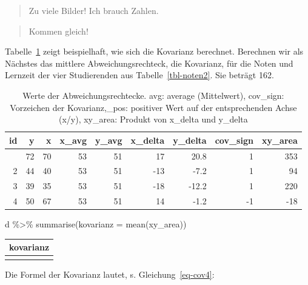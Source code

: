 \documentclass[
  letterpaper,
]{scrbook}
\newenvironment{Shaded}{\begin{snugshade}}{\end{snugshade}}
\newcommand{\AttributeTok}[1]{\textcolor[rgb]{0.40,0.45,0.13}{#1}}
\newcommand{\FunctionTok}[1]{\textcolor[rgb]{0.28,0.35,0.67}{#1}}
\newcommand{\NormalTok}[1]{\textcolor[rgb]{0.00,0.23,0.31}{#1}}
\newcommand{\SpecialCharTok}[1]{\textcolor[rgb]{0.37,0.37,0.37}{#1}}
\theoremstyle{definition}
\theoremstyle{definition}
\theoremstyle{definition}
\theoremstyle{remark}
\begin{document}
\begin{quote}
{} Zu viele Bilder! Ich brauch Zahlen.
\end{quote}

\begin{quote}
{} Kommen gleich!
\end{quote}

Tabelle~\ref{tbl-kov2} zeigt beispielhaft, wie sich die Kovarianz
berechnet. Berechnen wir als Nächstes das mittlere Abweichungsrechteck,
die Kovarianz, für die Noten und Lernzeit der vier Studierenden aus
Tabelle~\ref{tbl-noten2}. Sie beträgt 162.

\begin{longtable}[]{@{}rrrrrrrrr@{}}

\caption{\label{tbl-kov2}Werte der Abweichungsrechtecke. avg: average
(Mittelwert), cov\_sign: Vorzeichen der Kovarianz,\_pos: positiver Wert
auf der entsprechenden Achse (x/y), xy\_area: Produkt von x\_delta und
y\_delta}

\tabularnewline

\toprule\noalign{}
id & y & x & x\_avg & y\_avg & x\_delta & y\_delta & cov\_sign &
xy\_area \\
\midrule\noalign{}
\endhead
\bottomrule\noalign{}
\endlastfoot
1 & 72 & 70 & 53 & 51 & 17 & 20.8 & 1 & 353 \\
2 & 44 & 40 & 53 & 51 & -13 & -7.2 & 1 & 94 \\
3 & 39 & 35 & 53 & 51 & -18 & -12.2 & 1 & 220 \\
4 & 50 & 67 & 53 & 51 & 14 & -1.2 & -1 & -18 \\

\end{longtable}

\begin{Shaded}
\begin{Highlighting}[]
\NormalTok{d }\SpecialCharTok{\%\textgreater{}\%}
  \FunctionTok{summarise}\NormalTok{(}\AttributeTok{kovarianz =} \FunctionTok{mean}\NormalTok{(xy\_area))}
\end{Highlighting}
\end{Shaded}

\begin{longtable}[]{@{}r@{}}
\toprule\noalign{}
kovarianz \\
\midrule\noalign{}
\endhead
\bottomrule\noalign{}
\endlastfoot
162 \\
\end{longtable}

Die Formel der Kovarianz lautet, s. Gleichung~\ref{eq-cov4}:
\end{document}
